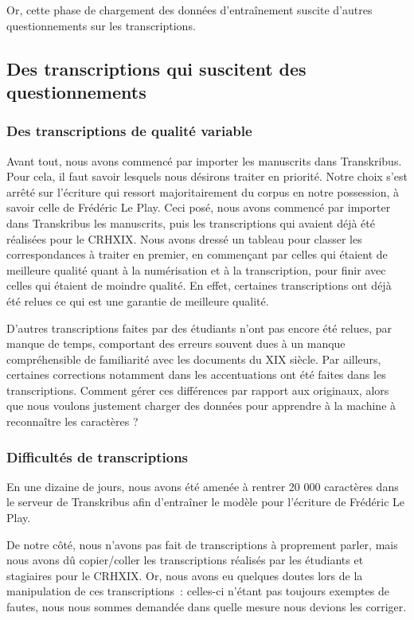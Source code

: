 Or, cette phase de chargement des données d'entraînement suscite d'autres questionnements sur les transcriptions. 


\subsection{Des transcriptions qui suscitent des questionnements}

\subsubsection{Des transcriptions de qualité variable}

Avant tout, nous avons commencé par importer les manuscrits dans Transkribus. Pour cela, il faut savoir lesquels nous désirons traiter en priorité. Notre choix s'est arrêté sur l'écriture qui ressort majoritairement du corpus en notre possession, à savoir celle de Frédéric Le Play. Ceci posé, nous avons commencé par importer dans Transkribus les manuscrits, puis les transcriptions qui avaient déjà été réalisées pour le CRHXIX. Nous avons dressé un tableau pour classer les correspondances à traiter en premier, en commençant par celles qui étaient de meilleure qualité quant à la numérisation et à la transcription, pour finir avec celles qui étaient de moindre qualité. En effet, certaines transcriptions ont déjà été relues ce qui est une garantie de meilleure qualité.

D'autres transcriptions faites par des étudiants n'ont pas encore été relues, par manque de temps, comportant des erreurs souvent dues à un manque compréhensible de familiarité avec les documents du XIX siècle. Par ailleurs, certaines corrections notamment dans les accentuations ont été faites dans les transcriptions. Comment gérer ces différences par rapport aux originaux, alors que nous voulons justement charger des données pour apprendre à la machine à reconnaître les caractères ?

\subsubsection{Difficultés de transcriptions}

En une dizaine de jours, nous avons été amenée à rentrer 20 000 caractères dans le serveur de Transkribus afin d'entraîner le modèle pour l'écriture de Frédéric Le Play. 

De notre côté, nous n'avons pas fait de transcriptions à proprement parler, mais nous avons dû copier/coller les transcriptions réalisés par les étudiants et stagiaires pour le CRHXIX. Or, nous avons eu quelques doutes lors de la manipulation de ces transcriptions~: celles-ci n'étant pas toujours exemptes de fautes, nous nous sommes demandée dans quelle mesure nous devions les corriger.

